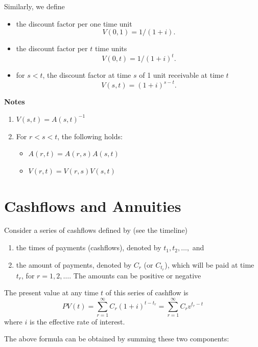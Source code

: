 \documentclass[landscape, 20pt]{extreport}
\theoremstyle{definition}
\theoremstyle{definition}
\theoremstyle{definition}
\theoremstyle{definition}
\theoremstyle{remark}
\begin{document}
Similarly, we define

\begin{itemize}
\item
  the discount factor per one time unit \[V(0,1) = 1/(1 + i).\]
\item
  the discount factor per \(t\) time units \[V(0,t) = 1/(1 + i)^t.\]
\item
  for \(s < t\), the discount factor at time \(s\) of 1 unit receivable at
  time \(t\) \[V(s,t) =  (1 + i)^{s - t}.\]
\end{itemize}

\textbf{Notes}

\begin{enumerate}
\def\labelenumi{\arabic{enumi}.}
\item
  \(V(s,t) = A(s,t)^{-1}\)
\item
  For \(r < s < t\), the following holds:

  \begin{itemize}
  \item
    \(A(r,t) = A(r,s) A(s,t)\)
  \item
    \(V(r,t) = V(r,s) V(s,t)\)
  \end{itemize}
\end{enumerate}




\hypertarget{cashflows-and-annuities}{%
\section{Cashflows and Annuities}\label{cashflows-and-annuities}}

Consider a series of cashflows defined by (see the timeline)

\begin{enumerate}
\def\labelenumi{\arabic{enumi}.}
\item
  the times of payments (cashflows), denoted by \(t_1, t_2, \ldots,\)
  and
\item
  the amount of payments, denoted by \(C_{r}\) (or \(C_{t_r}\)), which
  will be paid at time \(t_r\), for \(r = 1,2, \ldots\). The amounts can
  be positive or negative
\end{enumerate}

The present value at any time \(t\) of this series of cashflow is
\[PV(t) = \sum_{r=1}^\infty C_r (1 + i)^{t - t_r} = \sum_{r=1}^\infty C_r v^{t _r - t}\]
where \(i\) is the effective rate of interest.

The above formula can be obtained by summing these two components:
\end{document}
